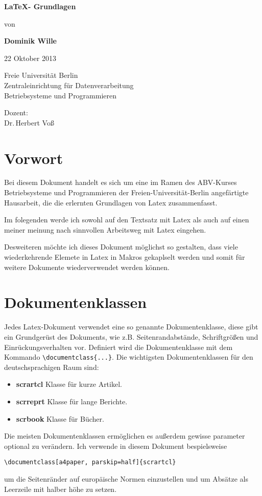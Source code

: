 \documentclass[a4paper, parskip=half]{scrartcl}
\newcommand{\myImage}[2]{
  \begin{center}
    \begin{minipage}{\linewidth}
      \centering
      \makebox[0cm]{\texttt{[image: \#1]}}
    \end{minipage}
    \ifthenelse{ \equal{#2}{}} {
      
    } {
    \captionof{figure}{#2}
    }
  \end{center}
}
\newcommand{\myTitle}{\LaTeX - Grundlagen}
\newcommand{\myAuthor}{Dominik Wille}
\newcommand{\myDate}{22 Oktober 2013}
\begin{document}
\begin{titlepage}
  \begin{center}
    \vspace{5cm}
    \huge\bfseries
    \myTitle
    \vspace{1cm}

    \large\normalfont von

    \bigskip
    \textbf{\myAuthor}

    \myDate

    \vspace{2cm}
    \myImage{images/typesetting}{} %
  \end{center}
  \vfill
  \enlargethispage{2cm}
  \parbox[t]{0.45\textwidth}{%
    Freie Universität Berlin\\
    Zentraleinrichtung für Datenverarbeitung\\
    Betriebsysteme und Programmieren
  }
  \parbox[t]{0.45\textwidth}{\raggedleft%
    Dozent: \\
    Dr.\,Herbert Voß\\
  }
\end{titlepage}
\section{Vorwort}
Bei diesem Dokument handelt es sich um eine im Ramen des ABV-Kurses Betriebsysteme und Programmieren der
Freien-Universität-Berlin angefärtigte Hausarbeit, die die erlernten Grundlagen von Latex zusammenfasst.

Im folegenden werde ich sowohl auf den Textsatz mit Latex als auch auf einen meiner meinung nach sinnvollen
Arbeitsweg mit Latex eingehen.

Desweiteren möchte ich dieses Dokument möglichst so gestalten, dass viele wiederkehrende Elemete in Latex in
Makros gekaplselt werden und somit für weitere Dokumente wiederverwendet werden können.

\section{Dokumentenklassen}
Jedes Latex-Dokument verwendet eine so genannte Dokumentenklasse, diese gibt ein Grundgerüst des Dokuments,
wie z.B. Seitenrandabstände, Schriftgrößen und Einrückungsverhalten vor. Definiert wird die Dokumentenklasse
mit dem Kommando \verb+\documentclass{...}+. Die wichtigsten Dokumentenklassen für den deutschsprachigen
Raum sind:
\begin{itemize}
\item \textbf{scrartcl} Klasse für kurze Artikel.
\item \textbf{scrreprt} Klasse für lange Berichte.
\item \textbf{scrbook} Klasse für Bücher.  
\end{itemize}
Die meisten Dokumentenklassen ermöglichen es außerdem gewisse parameter optional zu verändern. Ich verwende in
diesem Dokument bespielsweise 
\begin{verbatim}
\documentclass[a4paper, parskip=half]{scrartcl}
\end{verbatim}
um die Seitenränder auf europäische Normen einzustellen und um Absätze als Leerzeile mit halber höhe zu setzen.
\end{document}
